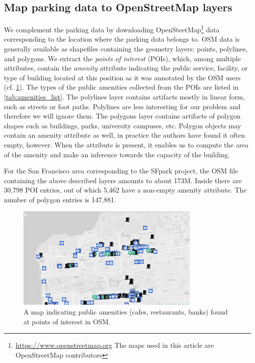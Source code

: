 \documentclass{ws-ijait}
\begin{document}
	\subsection{Map parking data to OpenStreetMap layers}
	We complement the parking data by downloading OpenSteetMap\footnote{\url{https://www.openstreetmap.org} The maps used in this article are \textcopyright OpenStreetMap contributors} data corresponding to the location where the parking data belongs to. OSM data is generally available as shapefiles containing the geometry layers: points, polylines, and polygons. We extract the \textit{points of interest} (POIs), which, among multiple attributes, contain the \textit{amenity} attribute indicating the public service, facility, or type of building located at this position as it was annotated by the OSM users (cf. \cref{fig:pois}). The types of the public amenities collected from the POIs are listed in \cref{tab:amenities_list}. The polylines layer contains artifacts mostly in linear form, such as streets or foot paths. Polylines are less interesting for our problem and therefore we will ignore them. The polygons layer contains artifacts of polygon shapes such as buildings, parks, university campuses, etc. Polygon objects may contain an amenity attribute as well, in practice the authors have found it often empty, however. When the attribute is present, it enables us to compute the area of the amenity and make an inference towards the capacity of the building.
	
	For the San Francisco area corresponding to the SFpark project, the OSM file containing the above described layers amounts to about 173M. Inside there are 30,798 POI entries, out of which 5,462 have a non-empty amenity attribute. The number of polygon entries is 147,881.  
	
	\begin{figure}[!ht]
		\centering
		\includegraphics[width=0.8\textwidth]{../graphics/cafes_restaurants_banks_larger.png}
		\caption{A map indicating public amenities (cafes, restaurants, banks) found at points of interest in OSM.}
		\label{fig:pois}
	\end{figure}
	
\end{document}
